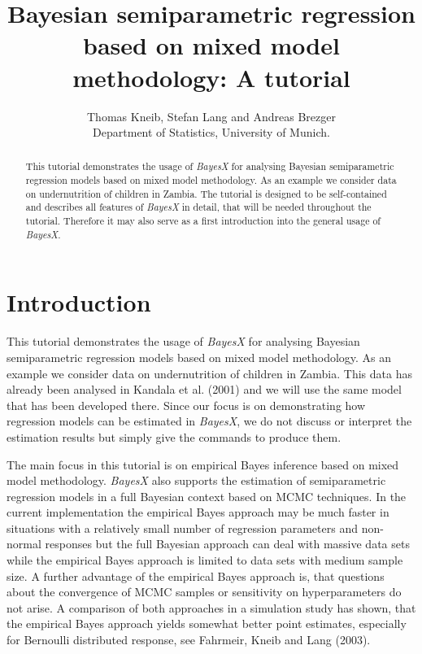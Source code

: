 \documentclass{article}
\begin{document}
\title{Bayesian semiparametric regression based on mixed model methodology: A tutorial}
\author{Thomas Kneib, Stefan Lang and Andreas Brezger\\ [.25cm]
\normalsize Department of Statistics, University of Munich. }
\maketitle

\begin{abstract}
This tutorial demonstrates the usage of {\it BayesX} for analysing
Bayesian semiparametric regression models based on mixed model
methodology. As an example we consider data on undernutrition of
children in Zambia. The tutorial is designed to be self-contained
and describes all features of {\it BayesX} in detail, that will be
needed throughout the tutorial. Therefore it may also serve as a
first introduction into the general usage of {\em BayesX}.
\end{abstract}

\tableofcontents

\newpage
\section{Introduction}\label{data}

This tutorial demonstrates the usage of {\it BayesX} for analysing
Bayesian semiparametric regression models based on mixed model
methodology. As an example we consider data on undernutrition of
children in Zambia. This data has already been analysed in Kandala
et al. (2001) \nocite{kanlan01} and we will use the same model
that has been developed there. Since our focus is on demonstrating
how regression models can be estimated in {\em BayesX}, we do not
discuss or interpret the estimation results but simply give the
commands to produce them.

The main focus in this tutorial is on empirical Bayes inference
based on mixed model methodology. {\it BayesX} also supports the
estimation of semiparametric regression models in a full Bayesian
context based on MCMC techniques. In the current implementation
the empirical Bayes approach may be much faster in situations with
a relatively small number of regression parameters and non-normal
responses but the full Bayesian approach can deal with massive
data sets while the empirical Bayes approach is limited to data
sets with medium sample size. A further advantage of the empirical
Bayes approach is, that questions about the convergence of MCMC
samples or sensitivity on hyperparameters do not arise. A
comparison of both approaches in a simulation study has shown,
that the empirical Bayes approach yields somewhat better point
estimates, especially for Bernoulli distributed response, see
Fahrmeir, Kneib and Lang (2003).
\end{document}
